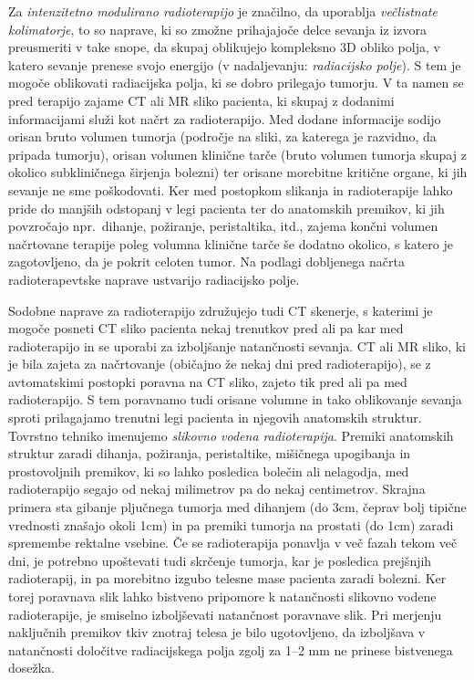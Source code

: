 \documentclass[journal]{IEEEtran}
\begin{document}
Za \emph{intenzitetno modulirano radioterapijo} je značilno, da uporablja \emph{večlistnate kolimatorje}, to so naprave, ki so zmožne prihajajoče delce sevanja iz izvora preusmeriti v take snope, da skupaj oblikujejo kompleksno 3D obliko polja, v katero sevanje prenese svojo energijo (v nadaljevanju: \emph{radiacijsko polje}). S tem je mogoče oblikovati radiacijska polja, ki se dobro prilegajo tumorju. V ta namen se pred terapijo zajame CT ali MR sliko pacienta, ki skupaj z dodanimi informacijami služi kot načrt za radioterapijo. Med dodane informacije sodijo orisan bruto volumen tumorja (področje na sliki, za katerega je razvidno, da pripada tumorju), orisan volumen klinične tarče (bruto volumen tumorja skupaj z okolico subkliničnega širjenja bolezni) ter orisane morebitne kritične organe, ki jih sevanje ne sme poškodovati. Ker med postopkom slikanja in radioterapije lahko pride do manjših odstopanj v legi pacienta ter do anatomskih premikov, ki jih povzročajo npr.~dihanje, požiranje, peristaltika, itd., zajema končni volumen načrtovane terapije poleg volumna klinične tarče še dodatno okolico, s katero je zagotovljeno, da je pokrit celoten tumor. Na podlagi dobljenega načrta radioterapevtske naprave ustvarijo radiacijsko polje.

Sodobne naprave za radioterapijo združujejo tudi CT skenerje, s katerimi je mogoče posneti CT sliko pacienta nekaj trenutkov pred ali pa kar med radioterapijo in se uporabi za izboljšanje natančnosti sevanja. CT ali MR sliko, ki je bila zajeta za načrtovanje (običajno že nekaj dni pred radioterapijo), se z avtomatskimi postopki poravna na CT sliko, zajeto tik pred ali pa med radioterapijo. S tem poravnamo tudi orisane volumne in tako oblikovanje sevanja sproti prilagajamo trenutni legi pacienta in njegovih anatomskih struktur. Tovrstno tehniko imenujemo \emph{slikovno vodena radioterapija}. Premiki anatomskih struktur zaradi dihanja, požiranja, peristaltike, mišičnega upogibanja in prostovoljnih premikov, ki so lahko posledica bolečin ali nelagodja, med radioterapijo segajo od nekaj milimetrov pa do nekaj centimetrov. Skrajna primera sta gibanje pljučnega tumorja med dihanjem (do 3cm, čeprav bolj tipične vrednosti znašajo okoli 1cm) in pa premiki tumorja na prostati (do 1cm) zaradi spremembe rektalne vsebine. Če se radioterapija ponavlja v več fazah tekom več dni, je potrebno upoštevati tudi skrčenje tumorja, kar je posledica prejšnjih radioterapij, in pa morebitno izgubo telesne mase pacienta zaradi bolezni. Ker torej poravnava slik lahko bistveno pripomore k natančnosti slikovno vodene radioterapije, je smiselno izboljševati natančnost poravnave slik. Pri merjenju naključnih premikov tkiv znotraj telesa je bilo ugotovljeno, da izboljšava v natančnosti določitve radiacijskega polja zgolj za 1--2 mm ne prinese bistvenega dosežka. 
\end{document}
